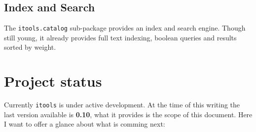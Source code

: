 \subsection{Index and Search}

The {\tt itools.catalog} sub-package provides an index and search engine.
Though still young, it already provides full text indexing, boolean queries
and results sorted by weight.


\section{Project status}

Currently {\tt itools} is under active development. At the time of this
writing the last version available is {\bf 0.10}, what it provides is
the scope of this document. Here I want to offer a glance about what is
comming next:


